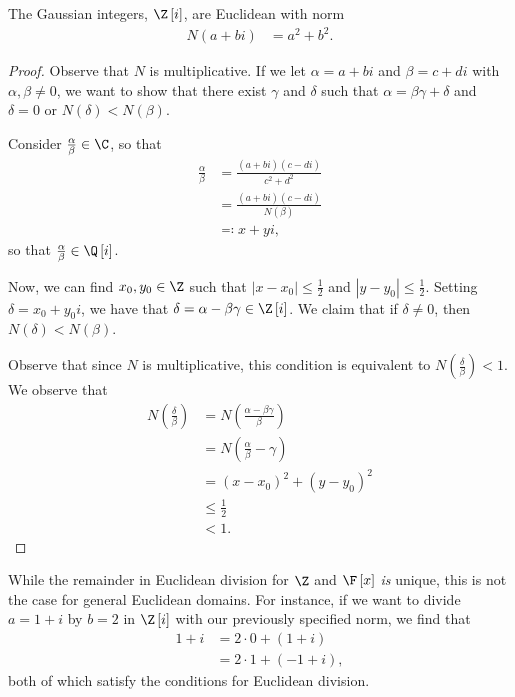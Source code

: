 \documentclass[10pt]{mypackage}
\begin{document}
\begin{theorem}
  The Gaussian integers, $\Z\left[ i \right]$, are Euclidean with norm
  \begin{align*}
    N\left(a + bi\right) &= a^2 + b^2.
  \end{align*}
\end{theorem}
\begin{proof}
  Observe that $N$ is multiplicative. If we let $\alpha = a + bi$ and $\beta = c + di$ with $\alpha,\beta\neq 0$, we want to show that there exist $\gamma$ and $\delta$ such that $\alpha = \beta \gamma + \delta$ and $\delta = 0$ or $N(\delta) < N(\beta)$.%

  Consider $\frac{\alpha}{\beta}\in \C$, so that
  \begin{align*}
    \frac{\alpha}{\beta} &= \frac{\left( a + bi \right)\left( c - di \right)}{c^2 + d^2}\\
                         &= \frac{\left( a + bi \right)\left( c -di \right)}{N(\beta)}\\
                         &\eqcolon x + yi,
  \end{align*}
  so that $ \frac{\alpha}{\beta}\in \Q\left[ i \right] $.%

  Now, we can find $x_0,y_0\in \Z$ such that $\left\vert x-x_0 \right\vert\leq \frac{1}{2}$ and $\left\vert y-y_0 \right\vert\leq \frac{1}{2}$. Setting $\delta = x_0 + y_0 i$, we have that $\delta = \alpha - \beta\gamma\in \Z\left[ i \right]$. We claim that if $\delta \neq 0$, then $N(\delta) < N(\beta)$.%

  Observe that since $N$ is multiplicative, this condition is equivalent to $N\left( \frac{\delta}{\beta} \right) < 1$. We observe that
  \begin{align*}
    N\left( \frac{\delta}{\beta} \right) &= N\left( \frac{\alpha - \beta \gamma}{\beta} \right)\\
                                         &= N\left( \frac{\alpha}{\beta} - \gamma \right)\\
                                         &= \left( x-x_0 \right)^2 + \left( y-y_0 \right)^2\\
                                         &\leq \frac{1}{2}\\
                                         &< 1.
  \end{align*}
\end{proof}
\begin{remark}
  While the remainder in Euclidean division for $\Z$ and $\F\left[ x \right]$ \textit{is} unique, this is not the case for general Euclidean domains. For instance, if we want to divide $a = 1 + i$ by $b = 2$ in $\Z\left[ i \right]$ with our previously specified norm, we find that 
  \begin{align*}
    1 + i &= 2\cdot 0 + \left( 1 + i \right) \\
          &= 2\cdot 1 + \left( -1 + i \right),
  \end{align*}
  both of which satisfy the conditions for Euclidean division.
\end{remark}
\end{document}
